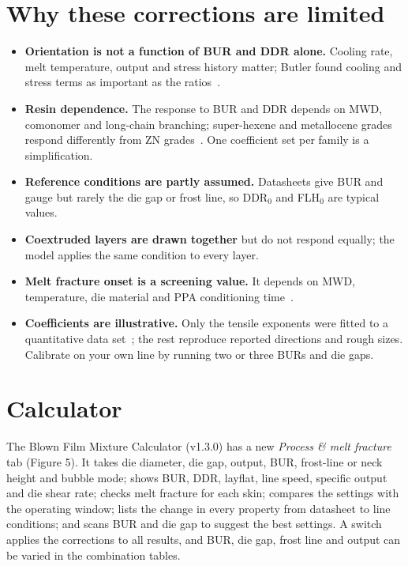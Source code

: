 \documentclass[conference,a4paper]{IEEEtran}
\begin{document}
\section{Why these corrections are limited}

\begin{itemize}
\item \textbf{Orientation is not a function of BUR and DDR alone.} Cooling rate, melt temperature, output and stress history matter; Butler found cooling and stress terms as important as the ratios~\cite{r4}.
\item \textbf{Resin dependence.} The response to BUR and DDR depends on MWD, comonomer and long-chain branching; super-hexene and metallocene grades respond differently from ZN grades~\cite{r3,r16}. One coefficient set per family is a simplification.
\item \textbf{Reference conditions are partly assumed.} Datasheets give BUR and gauge but rarely the die gap or frost line, so DDR$_{\mathrm{0}}$ and FLH$_{\mathrm{0}}$ are typical values.
\item \textbf{Coextruded layers are drawn together} but do not respond equally; the model applies the same condition to every layer.
\item \textbf{Melt fracture onset is a screening value.} It depends on MWD, temperature, die material and PPA conditioning time~\cite{r10,r11}.
\item \textbf{Coefficients are illustrative.} Only the tensile exponents were fitted to a quantitative data set~\cite{r2}; the rest reproduce reported directions and rough sizes. Calibrate on your own line by running two or three BURs and die gaps.
\end{itemize}

\section{Calculator}

The Blown Film Mixture Calculator (v1.3.0) has a new \emph{Process \& melt fracture} tab (Figure 5). It takes die diameter, die gap, output, BUR, frost-line or neck height and bubble mode; shows BUR, DDR, layflat, line speed, specific output and die shear rate; checks melt fracture for each skin; compares the settings with the operating window; lists the change in every property from datasheet to line conditions; and scans BUR and die gap to suggest the best settings. A switch applies the corrections to all results, and BUR, die gap, frost line and output can be varied in the combination tables.
\end{document}
